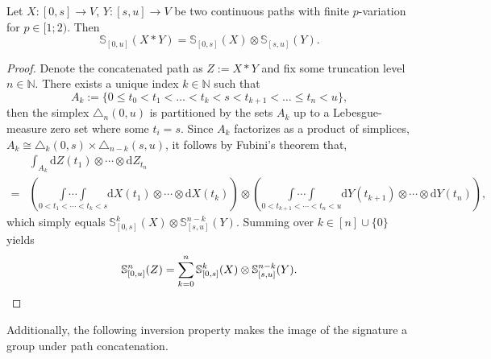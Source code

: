 \documentclass[openany]{book}
\begin{document}
\begin{theorem}
     Let $X:[0,s]\to V$, $Y:[s,u]\to V$ be two continuous paths with finite $p$-variation for $p\in [1;2)$. Then
     \begin{equation*}
         \mathbb S_{[0,u]}(X\ast Y)=\mathbb S_{[0,s]}(X)\otimes \mathbb S_{[s,u]}(Y).
     \end{equation*}
     \begin{proof}
        Denote the concatenated path as $Z:=X\ast Y$ and fix some truncation level $n\in \mathbb N$. There exists a unique index $k\in \mathbb N$ such that 
        \begin{equation*}
            A_k:=\{0\leq t_0<t_1<\dots<t_k<s<t_{k+1}<\dots\leq t_{n}<u\},
        \end{equation*}
        then the simplex $\triangle_n(0,u)$ is partitioned by the sets $A_k$ up to a Lebesgue-measure zero set where some $t_i=s$. Since $A_k$ factorizes as a product of simplices, $A_k\cong \triangle_{k}(0,s)\times \triangle_{n-k}(s,u)$, it follows by Fubini's theorem that,
        \begin{equation*}
            \begin{split}
                &\int_{A_k}\mathrm dZ(t_1)\otimes \cdots \otimes \mathrm dZ_{t_n}\\
                =&\left(\underset{0<t_1<\cdots<t_k<s}{\int\cdots \int}\mathrm dX(t_1)\otimes \cdots \otimes \mathrm dX(t_k)\right)\otimes \left(\underset{0<t_{k+1}<\cdots<t_n<u}{\int\cdots \int}\mathrm dY(t_{k+1})\otimes \cdots \otimes \mathrm dY({t_{n}})\right),
            \end{split}
        \end{equation*}
        which simply equals $\mathbb S^k_{[0,s]}(X)\otimes \mathbb S^{n-k}_{[s,u]}(Y)$. Summing over $k\in [n]\cup\{0\}$ yields
        \begin{equation*}
            \mathbb S^n_{[0,u]}(Z)=\sum_{k=0}^n \mathbb S^k_{[0,s]}(X)\otimes \mathbb S^{n-k}_{[s,u]}(Y).\qedhere
        \end{equation*}
    \end{proof}
\end{theorem}
Additionally, the following inversion property makes the image of the signature a group under path concatenation.
\end{document}
